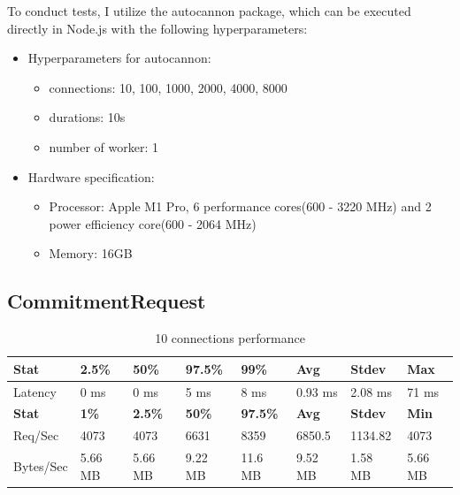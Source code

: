 \documentclass[../Main.tex]{subfiles}
\begin{document}
To conduct tests, I utilize the autocannon\cite{autocannon} package, which can be executed directly in Node.js with the following hyperparameters:
\begin{itemize}
  \item Hyperparameters for autocannon:
    \begin{itemize}
      \item connections: 10, 100, 1000, 2000, 4000, 8000
      \item durations: 10s
      \item number of worker: 1
    \end{itemize}
  \item Hardware specification:
    \begin{itemize}
      \item Processor: Apple M1 Pro, 6 performance cores(600 - 3220 MHz) and 2 power efficiency core(600 - 2064 MHz)
      \item Memory: 16GB
    \end{itemize}
\end{itemize}

\subsection{CommitmentRequest}
\begin{table}[H]
\centering
\begin{tabular}{|l|l|l|l|l|l|l|l|}
\hline
\rowcolor[HTML]{f56b00}
\textbf{Stat} & \textbf{2.5\%} & \textbf{50\%} & \textbf{97.5\%} & \textbf{99\%} & \textbf{Avg} & \textbf{Stdev} & \textbf{Max} \\
\hline
Latency   & 0 ms  & 0 ms & 5 ms   & 8 ms & 0.93 ms & 2.08 ms & 71 ms \\
\hline
\rowcolor[HTML]{f56b00}
\textbf{Stat} & \textbf{1\%} & \textbf{2.5\%} & \textbf{50\%} & \textbf{97.5\%} & \textbf{Avg} & \textbf{Stdev} & \textbf{Min} \\
Req/Sec   & 4073  & 4073  & 6631   & 8359   & 6850.5  & 1134.82 & 4073  \\
\hline
Bytes/Sec & 5.66 MB & 5.66 MB & 9.22 MB & 11.6 MB & 9.52 MB & 1.58 MB & 5.66 MB \\
\hline
\end{tabular}
 \caption{10 connections performance}
 \label{10-connections-performance}
\end{table}
\end{document}
